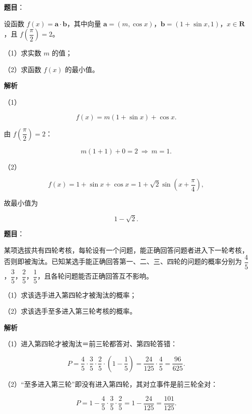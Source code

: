 \begin{answer}

\textbf{题目}：

设函数 $f(x)=\boldsymbol a\cdot\boldsymbol b$，其中向量 $\boldsymbol a=(m,\cos x)$，$\boldsymbol b=(1+\sin x,1)$，$x\in\mathbf R$，且 $f\left(\dfrac{\pi}{2}\right)=2$。

（1）求实数 $m$ 的值；

（2）求函数 $f(x)$ 的最小值。

\textbf{解析}

（1）

\nopagebreak[4]
\[f(x)=m(1+\sin x)+\cos x.\]

由 $f\left(\dfrac{\pi}{2}\right)=2$：

\nopagebreak[4]
\[m(1+1)+0=2\ \Rightarrow\ m=1.\]

（2）

\nopagebreak[4]
\[f(x)=1+\sin x+\cos x=1+\sqrt2\sin\left(x+\frac{\pi}{4}\right),\]

故最小值为

\nopagebreak[4]
\[1-\sqrt2.\]


\end{answer}
\begin{answer}

\textbf{题目}：

某项选拔共有四轮考核，每轮设有一个问题，能正确回答问题者进入下一轮考核，否则即被淘汰。已知某选手能正确回答第一、二、三、四轮的问题的概率分别为 $\dfrac45$，$\dfrac35$，$\dfrac25$，$\dfrac15$，且各轮问题能否正确回答互不影响。

（1）求该选手进入第四轮才被淘汰的概率；

（2）求该选手至多进入第三轮考核的概率。

\textbf{解析}

（1）进入第四轮才被淘汰＝前三轮都答对、第四轮答错：

\nopagebreak[4]
\[P=\frac45\cdot\frac35\cdot\frac25\cdot\left(1-\frac15\right)
=\frac{24}{125}\cdot\frac45=\frac{96}{625}.\]

（2）“至多进入第三轮”即没有进入第四轮，其对立事件是前三轮全对：

\nopagebreak[4]
\[P=1-\frac45\cdot\frac35\cdot\frac25=1-\frac{24}{125}=\frac{101}{125}.\]


\end{answer}

